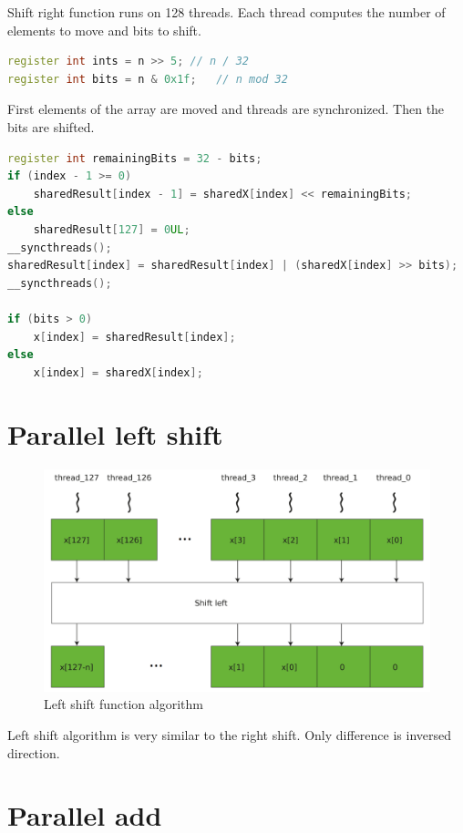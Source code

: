 \documentclass[oneside,openright,12pt,final,en]{mgr}
\begin{document}
Shift right function runs on 128 threads. Each thread computes the number of elements to move and bits to shift.

\begin{lstlisting}[language=cpp]
register int ints = n >> 5;	// n / 32
register int bits = n & 0x1f;	// n mod 32
\end{lstlisting}

First elements of the array are moved and threads are synchronized. Then the bits are shifted. 

\begin{lstlisting}[language=cpp]
register int remainingBits = 32 - bits;
if (index - 1 >= 0)
	sharedResult[index - 1] = sharedX[index] << remainingBits;
else
	sharedResult[127] = 0UL;
__syncthreads();
sharedResult[index] = sharedResult[index] | (sharedX[index] >> bits);
__syncthreads();

if (bits > 0)
	x[index] = sharedResult[index];
else
	x[index] = sharedX[index];
\end{lstlisting}

\section{Parallel left shift}

\begin{figure}[H]
	\centering
	\includegraphics[width=\textwidth]{al_leftshift}
	\caption{Left shift function algorithm}
	\label{fig:al_leftshift}
\end{figure}

Left shift algorithm is very similar to the right shift. Only difference is inversed direction. 


\section{Parallel add}
\end{document}
